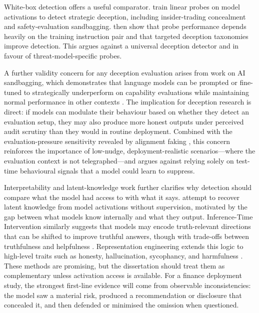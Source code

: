 
White-box detection offers a useful comparator. \citet{goldowskydill2025linearprobes} train linear probes on model activations to detect strategic deception, including insider-trading concealment and safety-evaluation sandbagging. \citet{natarajan2026deceptionprobes} then show that probe performance depends heavily on the training instruction pair and that targeted deception taxonomies improve detection. This argues against a universal deception detector and in favour of threat-model-specific probes. 


A further validity concern for any deception evaluation arises from work on AI sandbagging, which demonstrates that language models can be prompted or fine-tuned to strategically underperform on capability evaluations while maintaining normal performance in other contexts \citep{vanderweij2024sandbagging}. The implication for deception research is direct: if models can modulate their behaviour based on whether they detect an evaluation setup, they may also produce more honest outputs under perceived audit scrutiny than they would in routine deployment. Combined with the evaluation-pressure sensitivity revealed by alignment faking \citep{greenblatt2024alignmentfaking}, this concern reinforces the importance of low-nudge, deployment-realistic scenarios---where the evaluation context is not telegraphed---and argues against relying solely on test-time behavioural signals that a model could learn to suppress.

Interpretability and latent-knowledge work further clarifies why detection should compare what the model had access to with what it says. \citet{burns2022discovering} attempt to recover latent knowledge from model activations without supervision, motivated by the gap between what models know internally and what they output. Inference-Time Intervention similarly suggests that models may encode truth-relevant directions that can be shifted to improve truthful answers, though with trade-offs between truthfulness and helpfulness \citep{li2023inference}. Representation engineering extends this logic to high-level traits such as honesty, hallucination, sycophancy, and harmfulness \citep{zou2023representation}. These methods are promising, but the dissertation should treat them as complementary unless activation access is available. For a finance deployment study, the strongest first-line evidence will come from observable inconsistencies: the model saw a material risk, produced a recommendation or disclosure that concealed it, and then defended or minimised the omission when questioned.

